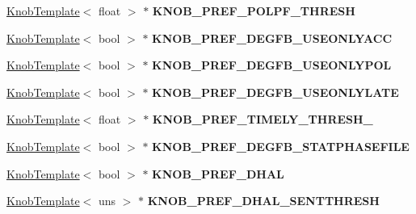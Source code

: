 \begin{DoxyCompactItemize}
\item 
\hypertarget{classall__knobs__c_a50e8c01770954d7f6d9e297cb29cbff4}{
\hyperlink{classKnobTemplate}{KnobTemplate}$<$ float $>$ $\ast$ {\bfseries KNOB\_\-PREF\_\-POLPF\_\-THRESH}}
\label{classall__knobs__c_a50e8c01770954d7f6d9e297cb29cbff4}

\item 
\hypertarget{classall__knobs__c_a99eef2a984220dfd2c9d820a30c5d089}{
\hyperlink{classKnobTemplate}{KnobTemplate}$<$ bool $>$ $\ast$ {\bfseries KNOB\_\-PREF\_\-DEGFB\_\-USEONLYACC}}
\label{classall__knobs__c_a99eef2a984220dfd2c9d820a30c5d089}

\item 
\hypertarget{classall__knobs__c_aee976183cfc9f0ae853872a94c226a9a}{
\hyperlink{classKnobTemplate}{KnobTemplate}$<$ bool $>$ $\ast$ {\bfseries KNOB\_\-PREF\_\-DEGFB\_\-USEONLYPOL}}
\label{classall__knobs__c_aee976183cfc9f0ae853872a94c226a9a}

\item 
\hypertarget{classall__knobs__c_a45ac9b56e7e751af5080ed73c41e6976}{
\hyperlink{classKnobTemplate}{KnobTemplate}$<$ bool $>$ $\ast$ {\bfseries KNOB\_\-PREF\_\-DEGFB\_\-USEONLYLATE}}
\label{classall__knobs__c_a45ac9b56e7e751af5080ed73c41e6976}

\item 
\hypertarget{classall__knobs__c_a68a9a82838fcf12c6fb38aa783a202bb}{
\hyperlink{classKnobTemplate}{KnobTemplate}$<$ float $>$ $\ast$ {\bfseries KNOB\_\-PREF\_\-TIMELY\_\-THRESH\_}}
\label{classall__knobs__c_a68a9a82838fcf12c6fb38aa783a202bb}

\item 
\hypertarget{classall__knobs__c_a9f5205f3b9650a333a9fa10ed5a7a675}{
\hyperlink{classKnobTemplate}{KnobTemplate}$<$ bool $>$ $\ast$ {\bfseries KNOB\_\-PREF\_\-DEGFB\_\-STATPHASEFILE}}
\label{classall__knobs__c_a9f5205f3b9650a333a9fa10ed5a7a675}

\item 
\hypertarget{classall__knobs__c_a65a41ed68dae4cc2f019db385084823a}{
\hyperlink{classKnobTemplate}{KnobTemplate}$<$ bool $>$ $\ast$ {\bfseries KNOB\_\-PREF\_\-DHAL}}
\label{classall__knobs__c_a65a41ed68dae4cc2f019db385084823a}

\item 
\hypertarget{classall__knobs__c_aefcde52abc54fc796eecb18cd85a58e5}{
\hyperlink{classKnobTemplate}{KnobTemplate}$<$ uns $>$ $\ast$ {\bfseries KNOB\_\-PREF\_\-DHAL\_\-SENTTHRESH}}
\label{classall__knobs__c_aefcde52abc54fc796eecb18cd85a58e5}


\end{DoxyCompactItemize}
